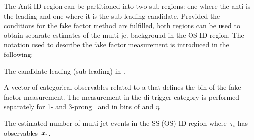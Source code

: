 {%
  \newcommand*{\ffargs}{\ensuremath{( \myvec{x}_{\tau} )}\xspace}

  \newcommand*{\NmjID}[2]{\ensuremath{N_\text{multi-jet}^{\text{#1, loose }\tau_{#2}}}\xspace}
  \newcommand*{\NmjIDIncl}[1]{\ensuremath{N_\text{multi-jet}^{\text{#1, ID}}}\xspace}

  \newcommand*{\NmjAntiIDIncl}[1]{\ensuremath{N_\text{multi-jet}^{\text{#1, Anti-ID}}}\xspace}
  \newcommand*{\NmjAntiID}[2]{\ensuremath{N_\text{multi-jet}^{\text{#1, anti-}\tau_{#2}}}\xspace}

  The Anti-ID region can be partitioned into two sub-regions: one
  where the anti-\tauhadvis is the leading and one where it is the
  sub-leading \tauhadvis candidate. Provided the conditions for the
  fake factor method are fulfilled, both regions can be used to obtain
  separate estimates of the multi-jet background in the OS ID
  region. The notation used to describe the fake factor measurement is
  introduced in the following:
  \begin{description}[style=standard]
  \item[$\tau_0$ ($\tau_1$)] The \tauhadvis candidate leading (sub-leading) in \pT.

  \item[$\myvec{x}_\tau$] A vector of categorical observables related
    to a \tauhadvis that defines the bin of the fake factor
    measurement. The measurement in the di-\tauhadvis trigger category
    is performed separately for 1- and 3-prong \tauhadvis, and in bins
    of \tauhadvis \pT and $\eta$.

  \item[$\NmjID{SS(OS)}{i}\ffargs$] The estimated number of multi-jet
    events in the SS (OS) ID region where~$\tau_i$ has
    observables~$\myvec{x}_\tau$.


\end{description}}
